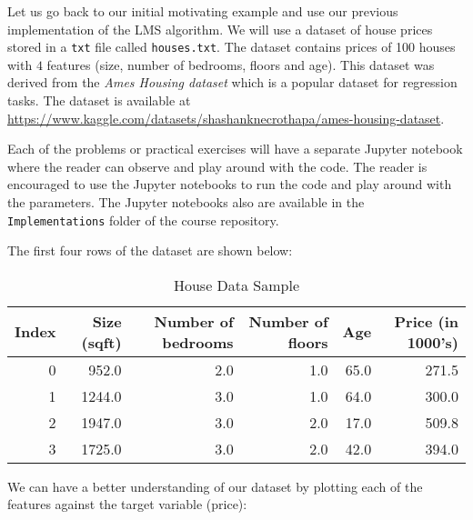 Let us go back to our initial motivating example and use our previous implementation of the LMS algorithm. We will use a dataset of house prices stored in a \texttt{txt} file called \texttt{houses.txt}. The dataset contains prices of 100 houses with $4$ features (size, number of bedrooms, floors and age). This dataset was derived from the \emph{Ames Housing dataset} which is a popular dataset for regression tasks. The dataset is available at \url{https://www.kaggle.com/datasets/shashanknecrothapa/ames-housing-dataset}. 

\begin{remark}
	Each of the problems or practical exercises will have a separate Jupyter notebook where the reader can observe and play around with the code. The reader is encouraged to use the Jupyter notebooks to run the code and play around with the parameters. The Jupyter notebooks also are available in the \faFolderOpen \texttt{Implementations} folder of the course repository. 
\end{remark}

The first four rows of the dataset are shown below: 
\pagebreak
\begin{table}[h] %
	\centering %
	\caption{House Data Sample} %
	\label{tab:house_data_booktabs} %
	\begin{tabular}{rrrrrr} %
	\toprule %
	\textbf{Index} & \textbf{Size (sqft)} & \textbf{Number of bedrooms} & \textbf{Number of floors} & \textbf{Age} & \textbf{Price (in 1000's)} \\
	\midrule %
	0 &  952.0 & 2.0 & 1.0 & 65.0 & 271.5 \\
	1 & 1244.0 & 3.0 & 1.0 & 64.0 & 300.0 \\
	2 & 1947.0 & 3.0 & 2.0 & 17.0 & 509.8 \\
	3 & 1725.0 & 3.0 & 2.0 & 42.0 & 394.0 \\
	\bottomrule %
	\end{tabular}
\end{table}

We can have a better understanding of our dataset by plotting each of the features against the target variable (price):


